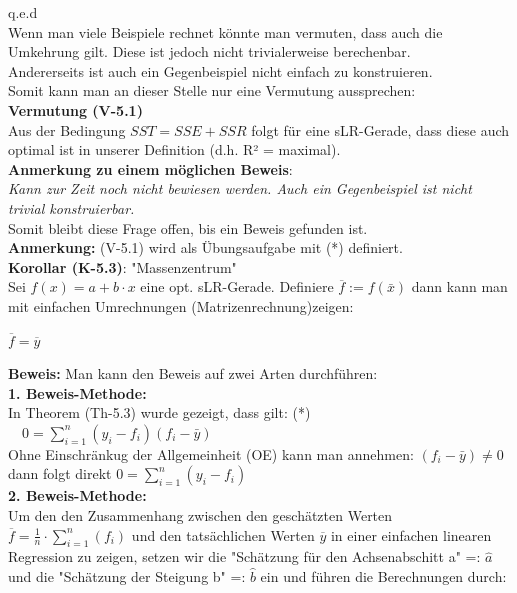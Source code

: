 \documentclass[12pt]{article}
\begin{document}
q.e.d \\[0.7cm]
%
Wenn man viele Beispiele rechnet könnte man vermuten, dass auch die Umkehrung gilt. Diese ist jedoch nicht trivialerweise berechenbar.\\ Andererseits ist auch ein Gegenbeispiel nicht einfach zu konstruieren.\\  Somit kann man an dieser Stelle nur eine Vermutung aussprechen: \\[0.2cm]
%
% 
\textbf{Vermutung (V-5.1)}\\[0.2cm]
Aus der Bedingung $ SST = SSE + SSR $ folgt für eine sLR-Gerade, dass diese auch optimal ist in unserer Definition (d.h. R² = maximal).\\[0.2cm] 
%
\textbf{Anmerkung zu einem möglichen Beweis}:\\ 
%
\textit{Kann zur Zeit noch nicht bewiesen werden. Auch ein Gegenbeispiel ist nicht trivial konstruierbar.}\\
Somit bleibt diese Frage offen, bis ein Beweis gefunden ist.\\[0.3
cm]
%
\textbf{Anmerkung:} (V-5.1) wird als Übungsaufgabe mit (*) definiert.\\[0.4cm]
\textbf{Korollar (K-5.3)}: "Massenzentrum" \\
Sei $ f(x) =  a + b \cdot x $ eine opt. sLR-Gerade. Definiere $\overline{f} := f(\bar{x})$ dann kann man mit einfachen Umrechnungen (Matrizenrechnung)zeigen: 
\begin{large}
\begin{center}
$ \overline{f} = \overline{y} $ \\
\end{center} 
\end{large}
%
\textbf{Beweis:} Man kann den Beweis auf zwei Arten durchführen:\\
\textbf{1. Beweis-Methode:}\\
In Theorem (Th-5.3) wurde gezeigt, dass gilt: (*) $ \quad 0 = \sum_{i=1}^{n} (y_i - f_i)(f_i - \bar{y})$ \\
Ohne Einschränkug der Allgemeinheit (OE) kann man annehmen: $(f_i - \bar{y}) \neq 0 $ \\ dann folgt direkt $0 = \sum_{i=1}^{n} (y_i - f_i)$ \\
\textbf{2. Beweis-Methode:}\\
Um den den Zusammenhang zwischen den geschätzten Werten $ \overline{f} = \frac{1}{n} \cdot \sum_{i=1}^{n} (f_i)$ und den tatsächlichen Werten $ \overline{y} $ in einer einfachen linearen Regression zu zeigen, setzen wir die "Schätzung für den Achsenabschitt a"  =: $ \hat{a} $ und die "Schätzung der Steigung b" =: $ \hat{b} $ ein und führen die Berechnungen durch:
\end{document}
